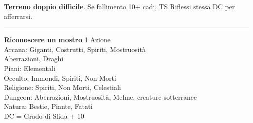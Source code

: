 \documentclass[a4paper,12 pt,openany]{book}
\newcommand{\riga}{\rule{\textwidth}{0.4pt}}
\begin{document}
\begin{textblock*}{7.4cm}
\textbf{Terreno doppio difficile}. Se fallimento 10+ cadi, TS Riflessi stessa DC per afferrarsi.

\riga

\textbf{Riconoscere un mostro} 1 Azione\\
Arcana: Giganti, Costrutti, Spiriti, Mostruosità\\
Aberrazioni, Draghi\\
Piani: Elementali\\
Occulto: Immondi, Spiriti, Non Morti\\
Religione: Spiriti, Non Morti, Celestiali\\
Dungeon: Aberrazioni, Mostruosità, Melme, creature sotterranee\\
Natura: Bestie, Piante, Fatati\\
DC = Grado di Sfida + 10

\end{textblock*}
\end{document}
